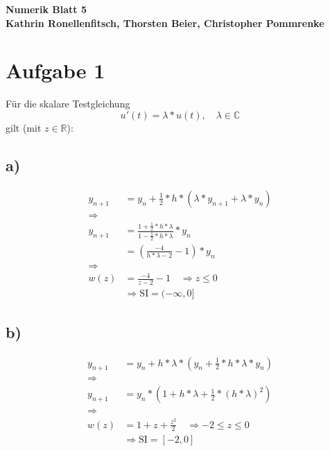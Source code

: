 \documentclass[10pt,oneside,a4paper]{scrartcl}
\begin{document}
    \begin{center}
        \huge %
        \bfseries %
        \sffamily %
        Numerik Blatt 5\\[1em]
        \normalsize
        Kathrin Ronellenfitsch, Thorsten Beier, Christopher Pommrenke
    \end{center}

    
    \section*{Aufgabe 1}
        Für die skalare Testgleichung
        \begin{equation*}
            u'(t) = \lambda * u(t), \quad \lambda \in{\mathbb{C}}
        \end{equation*}
        gilt (mit $z \in \mathbb{R}$):
        
        \subsection*{a)}
            \begin{align*}
                y_{n + 1} &= y_n + \frac{1}{2} * h * (\lambda * y_{n + 1} +
                \lambda * y_n)\\
                \Rightarrow\\
                y_{n + 1} &= \frac{1 + \frac{1}{2} * h * \lambda}{1 -
                \frac{1}{2} * h * \lambda} * y_n\\
                &= (\frac{-4}{h * \lambda - 2} - 1) * y_n\\
                \Rightarrow\\
                w(z) &= \frac{-4}{z - 2} - 1 \quad \Rightarrow z \leq 0\\
                &\Rightarrow \text{SI} = (-\infty, 0]                
            \end{align*}

        \subsection*{b)}
            \begin{align*}
                y_{n + 1} &= y_n + h * \lambda * (y_n + \frac{1}{2} * h *
                \lambda * y_n)\\
                \Rightarrow\\
                y_{n + 1} &= y_n * (1 + h * \lambda + \frac{1}{2} * (h *
                \lambda)^2)\\
                \Rightarrow\\ w(z) &= 1 + z + \frac{z^2}{2} \quad
                \Rightarrow -2 \leq z \leq 0\\ &\Rightarrow \text{SI} =
                [-2, 0]
            \end{align*}
\end{document}
